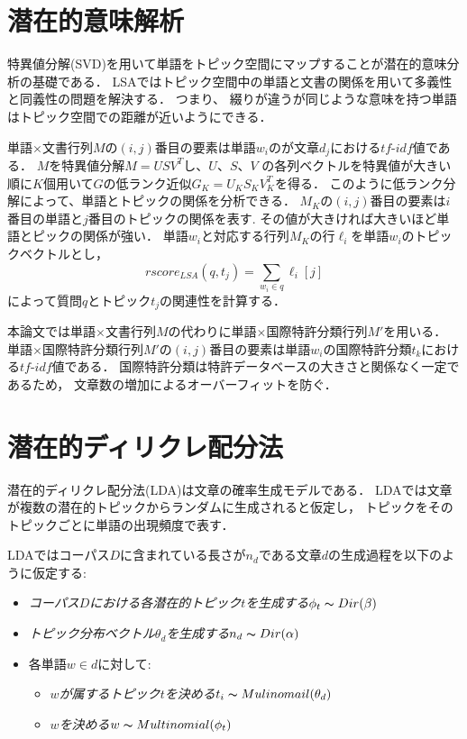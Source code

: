 \documentclass[master]{suribt}
\theoremstyle{definition}
\begin{document}
 \section{潜在的意味解析}
 特異値分解(SVD)を用いて単語をトピック空間にマップすることが潜在的意味分析の基礎である．
 LSAではトピック空間中の単語と文書の関係を用いて多義性と同義性の問題を解決する．
 つまり、 綴りが違うが同じような意味を持つ単語はトピック空間での距離が近いようにできる．

 単語$\times$文書行列$M$の$(i,j)$番目の要素は単語$w_i$のが文章$d_j$における$tf\text{-}idf$値である．
 $M$を特異値分解$M = USV^T$し、$U$、$S$、$V$ の各列ベクトルを特異値が大きい順に$K$個用いて$G$の低ランク近似$G_K=U_KS_KV_{K}^T$を得る．
 このように低ランク分解によって、単語とトピックの関係を分析できる．
 $M_K$の$(i,j)$番目の要素は$i$番目の単語と$j$番目のトピックの関係を表す.
 その値が大きければ大きいほど単語とピックの関係が強い．
 単語$w_i$と対応する行列$M_K$の行$\ell_i$を単語$w_i$のトピックベクトルとし，
 \begin{equation}
 rscore_{LSA}(q,t_j) = \sum_{w_i \in q}\ell_i[j]
 \end{equation}
 によって質問$q$とトピック$t_j$の関連性を計算する．
 
 本論文では単語$\times$文書行列$M$の代わりに単語$\times$国際特許分類行列$M'$を用いる．
 単語$\times$国際特許分類行列$M'$の$(i,j)$番目の要素は単語$w_i$の国際特許分類$t_k$における$tf\text{-}idf$値である．
 国際特許分類は特許データベースの大きさと関係なく一定であるため，
 文章数の増加によるオーバーフィットを防ぐ．

 \section{潜在的ディリクレ配分法}
 潜在的ディリクレ配分法(LDA)は文章の確率生成モデルである．
 LDAでは文章が複数の潜在的トピックからランダムに生成されると仮定し，
 トピックをそのトピックごとに単語の出現頻度で表す．

 
 LDAではコーパス$D$に含まれている長さが$n_d$である文章$d$の生成過程を以下のように仮定する:
 \begin{itemize}
 \item {\em コーパス$D$における各潜在的トピック$t$を生成する}$\phi_{t} \thicksim Dir(\beta)$
 \item {\em トピック分布ベクトル$\theta_d$を生成する}$n_d \thicksim Dir(\alpha)$
 \item 各単語$w \in d$に対して:
  \begin{itemize}
   \item {\em $w$が属するトピック$t$を決める}$t_i \thicksim Mulinomail(\theta_d)$
   \item {\em $w$を決める}$w \thicksim Multinomial(\phi_{t})$
  \end{itemize}
 \end{itemize}
 
\end{document}

